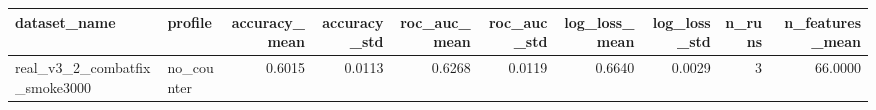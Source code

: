 \begin{tabular}{llrrrrrrrr}
\toprule
dataset_name & profile & accuracy_mean & accuracy_std & roc_auc_mean & roc_auc_std & log_loss_mean & log_loss_std & n_runs & n_features_mean \\
\midrule
real_v3_2_combatfix_smoke3000 & no_counter & 0.6015 & 0.0113 & 0.6268 & 0.0119 & 0.6640 & 0.0029 & 3 & 66.0000 \\
\bottomrule
\end{tabular}
